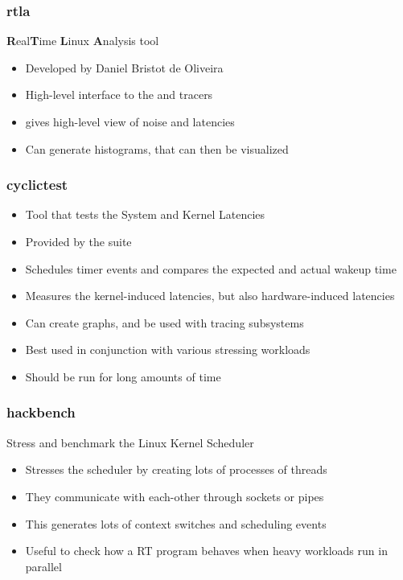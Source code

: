 \begin{frame}
	\frametitle{rtla}
	\textbf{R}eal\textbf{T}ime \textbf{L}inux \textbf{A}nalysis tool
	\begin{itemize}
		\item Developed by Daniel Bristot de Oliveira
		\item High-level interface to the  and  tracers
		\item {} gives high-level view of noise and latencies
		\item Can generate histograms, that can then be visualized
	\end{itemize}

\end{frame}

\begin{frame}
	\frametitle{cyclictest}
	\begin{itemize}
		\item Tool that tests the System and Kernel Latencies
		\item Provided by the  suite
		\item Schedules timer events and compares the expected and actual wakeup time
		\item Measures the kernel-induced latencies, but also hardware-induced latencies
		\item Can create graphs, and be used with tracing subsystems
		\item Best used in conjunction with various stressing workloads
		\item Should be run for long amounts of time
	\end{itemize}
\end{frame}

\begin{frame}
	\frametitle{hackbench}
	Stress and benchmark the Linux Kernel Scheduler
	\begin{itemize}
		\item Stresses the scheduler by creating lots of processes of threads
		\item They communicate with each-other through sockets or pipes
		\item This generates lots of context switches and scheduling events
		\item Useful to check how a RT program behaves when heavy workloads run in parallel
	\end{itemize}
\end{frame}

